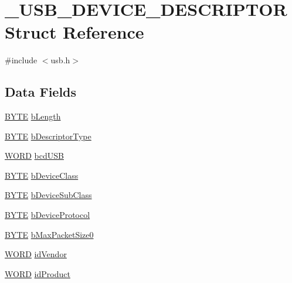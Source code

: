 \hypertarget{struct___u_s_b___d_e_v_i_c_e___d_e_s_c_r_i_p_t_o_r}{
\section{\_\-USB\_\-DEVICE\_\-DESCRIPTOR Struct Reference}
\label{struct___u_s_b___d_e_v_i_c_e___d_e_s_c_r_i_p_t_o_r}
}


{\ttfamily \#include $<$usb.h$>$}

\subsection*{Data Fields}
\begin{DoxyCompactItemize}
\item 
\hyperlink{type_8h_a4ae1dab0fb4b072a66584546209e7d58}{BYTE} \hyperlink{struct___u_s_b___d_e_v_i_c_e___d_e_s_c_r_i_p_t_o_r_a8e443464272fdf3bd5148df0b7f5dcaf}{bLength}
\item 
\hyperlink{type_8h_a4ae1dab0fb4b072a66584546209e7d58}{BYTE} \hyperlink{struct___u_s_b___d_e_v_i_c_e___d_e_s_c_r_i_p_t_o_r_ac1d02ce6fe165032044fb81602a9b07c}{bDescriptorType}
\item 
\hyperlink{type_8h_a197942eefa7db30960ae396d68339b97}{WORD} \hyperlink{struct___u_s_b___d_e_v_i_c_e___d_e_s_c_r_i_p_t_o_r_a813490518a88d421eb8eceaf467eab9b}{bcdUSB}
\item 
\hyperlink{type_8h_a4ae1dab0fb4b072a66584546209e7d58}{BYTE} \hyperlink{struct___u_s_b___d_e_v_i_c_e___d_e_s_c_r_i_p_t_o_r_ab1f7e35fe9a285db2864e8244884c4d9}{bDeviceClass}
\item 
\hyperlink{type_8h_a4ae1dab0fb4b072a66584546209e7d58}{BYTE} \hyperlink{struct___u_s_b___d_e_v_i_c_e___d_e_s_c_r_i_p_t_o_r_a1bfedb2dbf987caf616f77707f4e7996}{bDeviceSubClass}
\item 
\hyperlink{type_8h_a4ae1dab0fb4b072a66584546209e7d58}{BYTE} \hyperlink{struct___u_s_b___d_e_v_i_c_e___d_e_s_c_r_i_p_t_o_r_ad38c30dbe1ba3c63a2a24c3e2f988157}{bDeviceProtocol}
\item 
\hyperlink{type_8h_a4ae1dab0fb4b072a66584546209e7d58}{BYTE} \hyperlink{struct___u_s_b___d_e_v_i_c_e___d_e_s_c_r_i_p_t_o_r_aad07704534145b010921a7ca41a30edf}{bMaxPacketSize0}
\item 
\hyperlink{type_8h_a197942eefa7db30960ae396d68339b97}{WORD} \hyperlink{struct___u_s_b___d_e_v_i_c_e___d_e_s_c_r_i_p_t_o_r_aa6705f738420468e35fa0bcc980ef1d8}{idVendor}
\item 
\hyperlink{type_8h_a197942eefa7db30960ae396d68339b97}{WORD} \hyperlink{struct___u_s_b___d_e_v_i_c_e___d_e_s_c_r_i_p_t_o_r_ac5fdd724b5bba710af6f437f19467636}{idProduct}

\end{DoxyCompactItemize}
